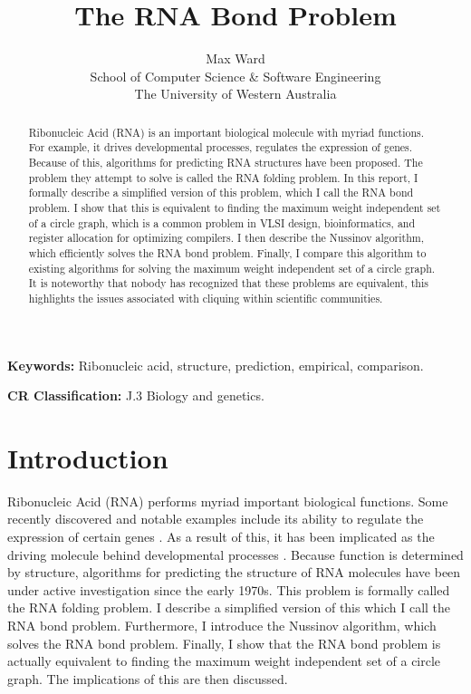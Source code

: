 \documentclass[12pt, a4paper]{article}
\title{The RNA Bond Problem}
\author{Max Ward \\
School of Computer Science \& Software Engineering \\
The University of Western Australia}
\begin{document}
\maketitle

\begin{abstract}
Ribonucleic Acid (RNA) is an important biological molecule with myriad functions. For example, it drives developmental processes, regulates the expression of genes. Because of this, algorithms for predicting RNA structures have been proposed. The problem they attempt to solve is called the RNA folding problem. In this report, I formally describe a simplified version of this problem, which I call the RNA bond problem. I show that this is equivalent to finding the maximum weight independent set of a circle graph, which is a common problem in VLSI design, bioinformatics, and register allocation for optimizing compilers. I then describe the Nussinov algorithm, which efficiently solves the RNA bond problem. Finally, I compare this algorithm to existing algorithms for solving the maximum weight independent set of a circle graph. It is noteworthy that nobody has recognized that these problems are equivalent, this highlights the issues associated with cliquing within scientific communities.
\end{abstract}


{\bf Keywords:} Ribonucleic acid, structure, prediction, empirical, comparison.

{\bf CR Classification:} J.3 Biology and genetics.

\clearpage


\section{Introduction}
Ribonucleic Acid (RNA) performs myriad important biological functions. Some recently discovered and notable examples include its ability to regulate the expression of certain genes \cite{mattick2007new}. As a result of this, it has been implicated as the driving molecule behind developmental processes \cite{mattick2007new}. Because function is determined by structure, algorithms for predicting the structure of RNA molecules have been under active investigation since the early 1970s. This problem is formally called the RNA folding problem. I describe a simplified version of this which I call the RNA bond problem. Furthermore, I introduce the Nussinov algorithm, which solves the RNA bond problem. Finally, I show that the RNA bond problem is actually equivalent to finding the maximum weight independent set of a circle graph. The implications of this are then discussed.
\end{document}
